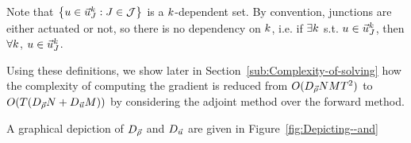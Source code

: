 Note that $\left\{ \convar\in\junccon{\jn}{\tind}:\jn\in\jns\right\} $
is a $k$-dependent set. By convention, junctions are either actuated
or not, so there is no dependency on $k$, i.e. if $\exists k$
s.t. $u\in\vec{u}_{J}^{k}$, then $\forall k$, $u\in\vec{u}_{J}^{k}$.

Using these definitions, we show later in Section~\ref{sub:Complexity-of-solving}
how the complexity of computing the gradient is reduced from $O(D_{\vec{\rho}}NMT^{2})$
to $O(\ntime\left(\degree{\state}\nlinks+\degree{\control}\ncontrols\right))$
by considering the adjoint method over the forward method.

A graphical depiction of $D_{\vec{\rho}}$ and $D_{\vec{u}}$ are given
in Figure~\ref{fig:Depicting--and}
\begin{figure}
	\begin{centering}
\end{centering}
\end{figure}
